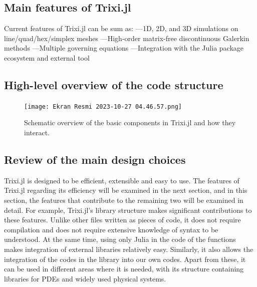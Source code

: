 \documentclass{article}
\begin{document}
\subsection{Main features of Trixi.jl}
Current  features of Trixi.jl can be sum as:
—1D, 2D, and 3D simulations on line/quad/hex/simplex meshes
—High-order matrix-free discontinuous Galerkin methods
—Multiple governing equations
—Integration with the Julia package ecosystem and external tool
\subsection{High-level overview of the code structure}
\begin{figure}[H]
    \centering
    \texttt{[image: Ekran Resmi 2023-10-27 04.46.57.png]}
    \caption{Schematic overview of the basic components in Trixi.jl and how they interact.}
    \cite{ranocha2021adaptive}
    \label{fig:enter-label}
\end{figure}
\subsection{Review of the main design choices}
Trixi.jl is designed to be efficient, extensible and easy to use. The features of Trixi.jl regarding its efficiency will be examined in the next section, and in this section, the features that contribute to the remaining two will be examined in detail. For example, Trixi.jl's library structure makes significant contributions to these features. Unlike other files written as pieces of code, it does not require compilation and does not require extensive knowledge of syntax to be understood. At the same time, using only Julia in the code of the functions makes integration of external libraries relatively easy. Similarly, it also allows the integration of the codes in the library into our own codes. Apart from these, it can be used in different areas where it is needed, with its structure containing libraries for PDEs and widely used physical systems.
\end{document}

